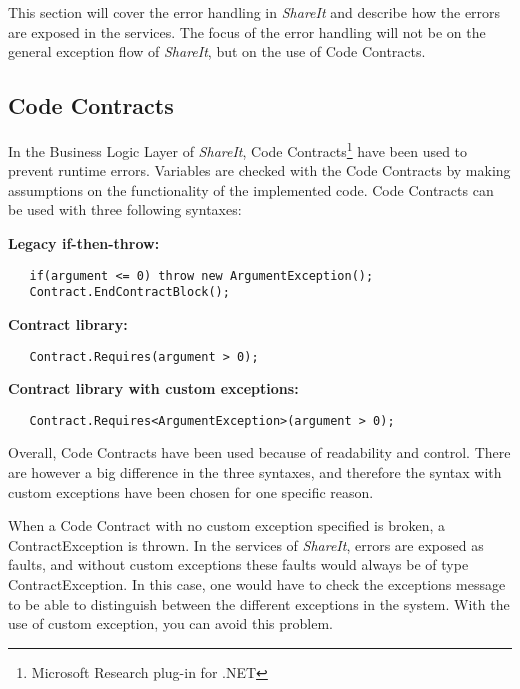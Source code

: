 \documentclass[../report.tex]{subfiles}
\begin{document}
This section will cover the error handling in \textit{ShareIt} and describe how the errors are exposed in the services. The focus of the error handling will not be on the general exception flow of \textit{ShareIt}, but on the use of Code Contracts.

\subsection{Code Contracts}


In the Business Logic Layer of \textit{ShareIt}, Code Contracts\footnote{Microsoft Research plug-in for .NET} have been used to prevent runtime errors. Variables are checked with the Code Contracts by making assumptions on the functionality of the implemented code. Code Contracts can be used with three following syntaxes:

 \textbf{Legacy if-then-throw:}
\begin{lstlisting}
   if(argument <= 0) throw new ArgumentException();  
   Contract.EndContractBlock();
\end{lstlisting}

\textbf{Contract library:}
\begin{lstlisting}
   Contract.Requires(argument > 0);
\end{lstlisting}

\textbf{Contract library with custom exceptions:}
\begin{lstlisting}
   Contract.Requires<ArgumentException>(argument > 0);
\end{lstlisting}

Overall, Code Contracts have been used because of readability and control. There are however a big difference in the three syntaxes, and therefore the syntax with custom exceptions have been chosen for one specific reason. 

When a Code Contract with no custom exception specified is broken, a ContractException is thrown. In the services of \textit{ShareIt}, errors are exposed as faults, and without custom exceptions these faults would always be of type ContractException. In this case, one would have to check the exceptions message to be able to distinguish between the different exceptions in the system. With the use of custom exception, you can avoid this problem. 
\end{document}
